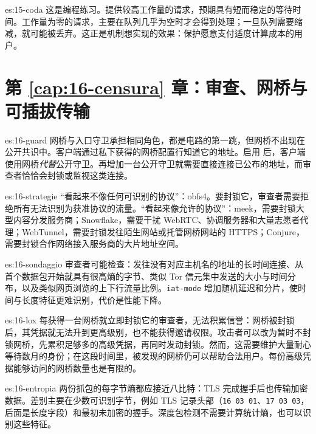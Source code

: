 \begin{soluzione}{es:15-coda}
这是编程练习。提供较高工作量的请求，预期具有短而稳定的等待时间。工作量为零的请求，主要在队列几乎为空时才会得到处理；一旦队列需要缩减，就可能被丢弃。这正是机制想实现的效果：保护愿意支付适度计算成本的用户。
\end{soluzione}

\section*{第 \ref{cap:16-censura} 章：审查、网桥与可插拔传输}

\begin{soluzione}{es:16-guard}
网桥与入口守卫承担相同角色，都是电路的第一跳，但网桥不出现在公开共识中。客户端通过私下获得的网桥配置行知道它的地址。启用  后，客户端使用网桥\emph{代替}公开守卫。再增加一台公开守卫就需要直接连接已公布的地址，而审查者恰恰会封锁或监视这类连接。
\end{soluzione}

\begin{soluzione}{es:16-strategie}
\enquote{看起来不像任何可识别的协议}：obfs4。要封锁它，审查者需要拒绝所有无法识别为获准协议的流量。\enquote{看起来像允许的协议}：meek，需要封锁大型内容分发服务商；Snowflake，需要干扰 WebRTC、协调服务器和大量志愿者代理；WebTunnel，需要封锁发往陌生网站或托管网桥网站的 HTTPS；Conjure，需要封锁合作网络接入服务商的大片地址空间。
\end{soluzione}

\begin{soluzione}{es:16-sondaggio}
审查者可能检查：发往没有对应主机名的地址的长时间连接、从首个数据包开始就具有很高熵的字节、类似 Tor 信元集中发送的大小与时间分布，以及类似网页浏览的上下行流量比例。\texttt{iat-mode} 增加随机延迟和分片，使时间与长度特征更难识别，代价是性能下降。
\end{soluzione}

\begin{soluzione}{es:16-lox}
每获得一台网桥就立即封锁它的审查者，无法积累信誉：网桥被封锁后，其凭据就无法升到更高级别，也不能获得邀请权限。攻击者可以改为暂时不封锁网桥，先累积足够多的高级凭据，再同时发动封锁。然而，这需要维护大量耐心等待数月的身份；在这段时间里，被发现的网桥仍可以帮助合法用户。每份高级凭据能够访问的网桥数量也是有限的。
\end{soluzione}

\begin{soluzione}{es:16-entropia}
两份抓包的每字节熵都应接近八比特：TLS 完成握手后也传输加密数据。差别主要在少数可识别字节，例如 TLS 记录头部（\texttt{16 03 01}、\texttt{17 03 03}，后面是长度字段）和最初未加密的握手。深度包检测不需要计算统计熵，也可以识别这些特征。
\end{soluzione}


